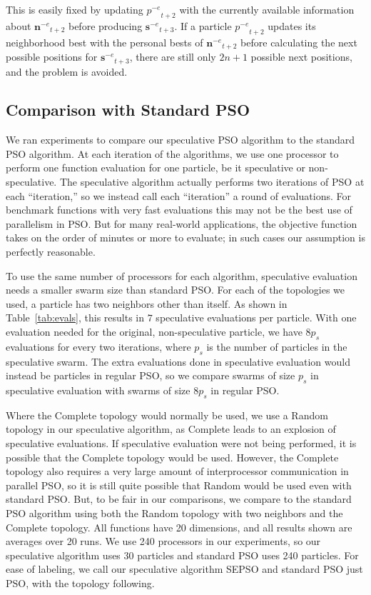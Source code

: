\documentclass[journal,letterpaper]{IEEEtran}
\providecommand{\noeval}[1]{\ensuremath{#1^{-e}}}
\providecommand{\p}{\ensuremath{p}}
\providecommand{\sset}{\ensuremath{\mathbf{s}}}
\providecommand{\nset}{\ensuremath{\mathbf{n}}}
\begin{document}
This is easily fixed by updating $\noeval{\p}_{t+2}$ with the currently
available information about $\noeval{\nset}_{t+2}$ before producing
$\noeval{\sset}_{t+3}$.  If a particle $\noeval{\p}_{t+2}$ updates its
neighborhood best with the personal bests of $\noeval{\nset}_{t+2}$ before
calculating the next possible positions for $\noeval{\sset}_{t+3}$, there are
still only $2n+1$ possible next positions, and the problem is avoided.

\subsection{Comparison with Standard PSO}
\label{sec:results}

We ran experiments to compare our speculative PSO algorithm to the standard
PSO algorithm.  At each iteration of the algorithms, we use one processor to
perform one function evaluation for one particle, be it speculative or
non-speculative.  The speculative algorithm actually performs two iterations of
PSO at each ``iteration,'' so we instead call each ``iteration'' a round of
evaluations.  For benchmark functions with very fast evaluations this may not
be the best use of parallelism in PSO.  But for many real-world applications,
the objective function takes on the order of minutes or more to evaluate; in
such cases our assumption is perfectly reasonable.

To use the same number of processors for each algorithm, speculative evaluation
needs a smaller swarm size than standard PSO.  For each of the topologies we
used, a particle has two neighbors other than itself.  As shown in
Table~\ref{tab:evals}, this results in $7$ speculative evaluations per
particle.  With one evaluation needed for the original, non-speculative
particle, we have $8p_s$ evaluations for every two iterations, where $p_s$ is
the number of particles in the speculative swarm.  The extra evaluations done
in speculative evaluation would instead be particles in regular PSO, so we
compare swarms of size $p_s$ in speculative evaluation with swarms of size
$8p_s$ in regular PSO.

Where the Complete topology would normally be used, we use a Random topology in
our speculative algorithm, as Complete leads to an explosion of speculative
evaluations.  If speculative evaluation were not being performed, it is
possible that the Complete topology would be used.  However, the Complete
topology also requires a very large amount of interprocessor communication in
parallel PSO, so it is still quite possible that Random would be used even with
standard PSO.  But, to be fair in our comparisons, we compare to the standard
PSO algorithm using both the Random topology with two neighbors and the
Complete topology.  All functions have 20 dimensions, and all results shown are
averages over 20 runs.  We use 240 processors in our experiments, so our
speculative algorithm uses 30 particles and standard PSO uses 240 particles.
For ease of labeling, we call our speculative algorithm SEPSO and standard PSO
just PSO, with the topology following.
\end{document}
